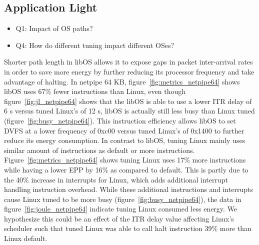 \subsection{Application Light}
\label{sec:q3}
\begin{itemize}
\item Q1: Impact of OS paths?
\item Q4: How do different tuning impact different OSes?
\end{itemize}


Shorter path length in libOS allows it to expose gaps in packet inter-arrival rates in order to save more energy by further reducing its processor frequency and take advantage of halting. In netpipe 64 KB, figure~\ref{fig:metrics_netpipe64} shows libOS uses 67\% fewer instructions than Linux,  even though figure~\ref{fig:jl_netpipe64} shows that the libOS is able to use a lower ITR delay of 6 \micro s versus tuned Linux's of 12 \micro s, libOS is actually still less busy than Linux tuned (figure~\ref{fig:busy_netpipe64}). This instruction efficiency allows libOS to set DVFS at a lower frequency of 0xc00 versus tuned Linux's of 0x1400 to further reduce its energy consumption. In contrast to libOS, tuning Linux mainly uses similar amount of instructions as default or more instructions. Figure~\ref{fig:metrics_netpipe64} shows tuning Linux uses 17\% more instructions while having a lower EPP by 16\% as compared to default. This is partly due to the 40\% increase in interrupts for Linux, which adds additional interrupt handling instruction overhead. While these additional instructions and interrupts cause Linux tuned to be more busy (figure~\ref{fig:busy_netpipe64}), the data in figure~\ref{fig:joule_netpipe64} indicate tuning Linux consumed less energy. We hypothesize this could be an effect of the ITR delay value affecting Linux's scheduler such that tuned Linux was able to call halt instruction 39\% more than Linux default.

